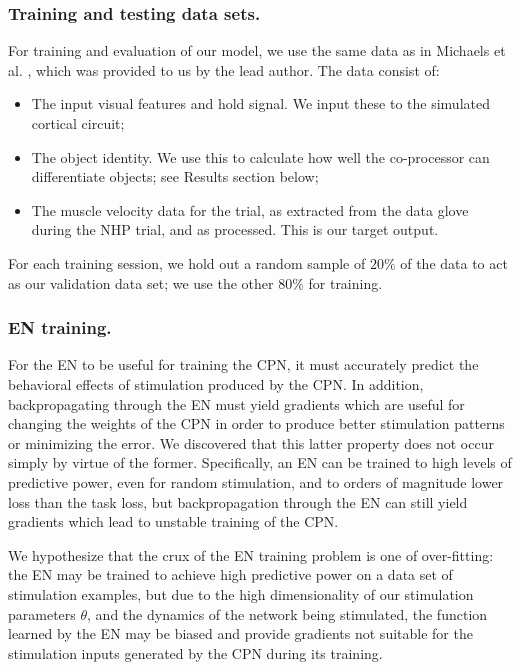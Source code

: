 \documentclass[12pt]{iopart}
\begin{document}
\subsubsection{Training and testing data sets.}
For training and evaluation of our model, we use the same data as in Michaels et al.
\cite{michaels.mrnn}, which was provided to us by the lead author. The data consist of:
\begin{itemize}
    \item The input visual features and hold signal. We input these to the simulated
          cortical circuit;
    \item The object identity. We use this to calculate how well the co-processor
          can differentiate objects; see Results section below;
    \item The muscle velocity data for the trial, as extracted from the data glove
          during the NHP trial, and as processed. This is our target output.
\end{itemize}

For each training session, we hold out a random sample of $20\%$ of the data to act as our validation data set; we
use the other $80\%$ for training.

\subsubsection{EN training.}
For the EN to be useful for training the CPN, it must accurately predict the behavioral effects of stimulation
produced by the CPN. In addition, backpropagating through the EN must yield gradients which are useful for
changing the weights of the CPN in order to produce better stimulation patterns or minimizing the error.
We discovered that this latter property does not occur simply by virtue of the former. Specifically, an EN
can be trained to high levels of predictive power, even for random stimulation, and to orders of magnitude
lower loss than the task loss, but backpropagation through the EN can still yield gradients which lead to
unstable training of the CPN. 

We hypothesize that the crux of the EN training problem is one of over-fitting: the EN may be trained
to achieve high predictive power on a data set of stimulation examples, but due to 
the high dimensionality of our stimulation parameters $\theta$, and the dynamics of the
network being stimulated, the function learned by the EN may be biased and provide gradients not suitable
for the stimulation inputs generated by the CPN during its training.
\end{document}

